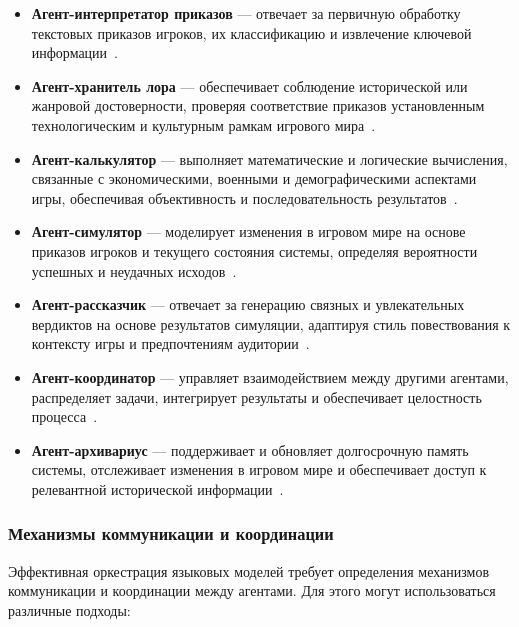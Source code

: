 \begin{itemize}
    \item \textbf{Агент-интерпретатор приказов} — отвечает за первичную обработку текстовых приказов игроков, их классификацию и извлечение ключевой информации~\cite{mialon2023augmented}.

    \item \textbf{Агент-хранитель лора} — обеспечивает соблюдение исторической или жанровой достоверности, проверяя соответствие приказов установленным технологическим и культурным рамкам игрового мира~\cite{zheng2023building}.

    \item \textbf{Агент-калькулятор} — выполняет математические и логические вычисления, связанные с экономическими, военными и демографическими аспектами игры, обеспечивая объективность и последовательность результатов~\cite{schick2023toolformer}.

    \item \textbf{Агент-симулятор} — моделирует изменения в игровом мире на основе приказов игроков и текущего состояния системы, определяя вероятности успешных и неудачных исходов~\cite{park2023generative}.

    \item \textbf{Агент-рассказчик} — отвечает за генерацию связных и увлекательных вердиктов на основе результатов симуляции, адаптируя стиль повествования к контексту игры и предпочтениям аудитории~\cite{yuan2022wordcraft}.

    \item \textbf{Агент-координатор} — управляет взаимодействием между другими агентами, распределяет задачи, интегрирует результаты и обеспечивает целостность процесса~\cite{hong2023metagpt}.

    \item \textbf{Агент-архивариус} — поддерживает и обновляет долгосрочную память системы, отслеживает изменения в игровом мире и обеспечивает доступ к релевантной исторической информации~\cite{zhong2023memgpt}.
\end{itemize}

\subsubsection{Механизмы коммуникации и координации}

Эффективная оркестрация языковых моделей требует определения механизмов коммуникации и координации между агентами. Для этого могут использоваться различные подходы:

